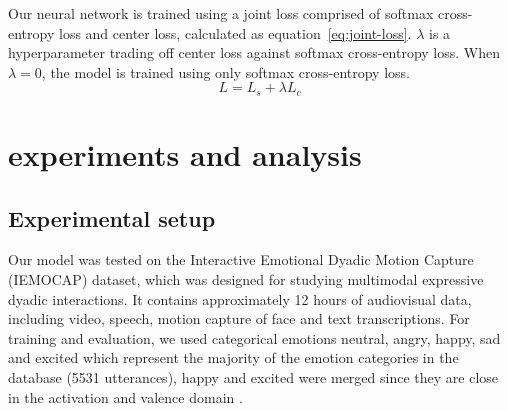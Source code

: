 \documentclass{article}
\begin{document}
Our neural network is trained using a joint loss comprised of softmax cross-entropy loss and center loss, calculated as equation~\ref{eq:joint-loss}. $\lambda$ is a hyperparameter trading off center loss against softmax cross-entropy loss. When  $\lambda=0$, the model is trained using only softmax cross-entropy loss.
\begin{equation} \label{eq:joint-loss}
L=L_s+ \lambda L_c
\end{equation}
%
%
%


\section{experiments and analysis}

\subsection{Experimental setup}
Our model was tested on the Interactive Emotional Dyadic Motion Capture (IEMOCAP) \cite{busso2008iemocap} dataset, which was designed for studying multimodal expressive dyadic interactions. It contains approximately 12 hours of audiovisual data, including video, speech, motion capture of face and text transcriptions. For training and evaluation, we used categorical emotions neutral, angry, happy, sad and excited which represent the majority of the emotion categories in the database (5531 utterances), happy and excited were merged since they are close in the activation and valence domain \cite{busso2008iemocap}.
\end{document}
